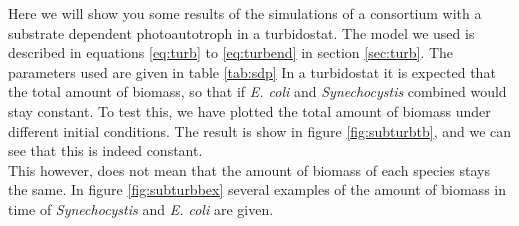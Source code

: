 \documentclass[12pt]{report}
\begin{document}
% 
% 
% 
% 

Here we will show you some results of the simulations of a consortium with a substrate dependent photoautotroph in a turbidostat. The model we used is described in equations \ref{eq:turb} to \ref{eq:turbend} in section \ref{sec:turb}. The parameters used are given in table \ref{tab:sdp}
In a turbidostat it is expected that the total amount of biomass, so that if \textit{E. coli} and \textit{Synechocystis} combined would stay constant. To test this, we have plotted the total amount of biomass under different initial conditions. The result is show in figure \ref{fig:subturbtb}, and we can see that this is indeed constant. \\
This however, does not mean that the amount of biomass of each species stays the same. In figure \ref{fig:subturbbex} several examples of the amount of biomass in time of \textit{Synechocystis} and \textit{E. coli} are given.
\end{document}
